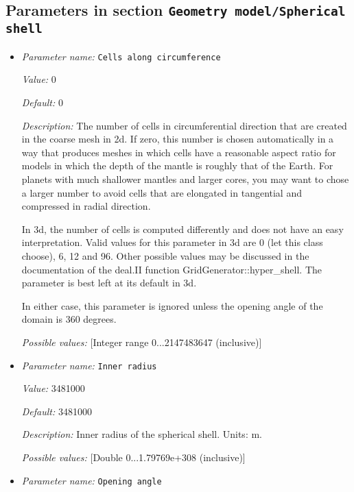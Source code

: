 \subsection{Parameters in section \tt Geometry model/Spherical shell}
\label{parameters:Geometry_20model/Spherical_20shell}

\begin{itemize}
\item {\it Parameter name:} {\tt Cells along circumference}
\label{parameters:Geometry model/Spherical shell/Cells along circumference}


{\it Value:} 0


{\it Default:} 0


{\it Description:} The number of cells in circumferential direction that are created in the coarse mesh in 2d. If zero, this number is chosen automatically in a way that produces meshes in which cells have a reasonable aspect ratio for models in which the depth of the mantle is roughly that of the Earth. For planets with much shallower mantles and larger cores, you may want to chose a larger number to avoid cells that are elongated in tangential and compressed in radial direction.

In 3d, the number of cells is computed differently and does not have an easy interpretation. Valid values for this parameter in 3d are 0 (let this class choose), 6, 12 and 96. Other possible values may be discussed in the documentation of the deal.II function GridGenerator::hyper_shell. The parameter is best left at its default in 3d.

In either case, this parameter is ignored unless the opening angle of the domain is 360 degrees.


{\it Possible values:} [Integer range 0...2147483647 (inclusive)]
\item {\it Parameter name:} {\tt Inner radius}
\label{parameters:Geometry model/Spherical shell/Inner radius}


{\it Value:} 3481000


{\it Default:} 3481000


{\it Description:} Inner radius of the spherical shell. Units: m.


{\it Possible values:} [Double 0...1.79769e+308 (inclusive)]
\item {\it Parameter name:} {\tt Opening angle}
\label{parameters:Geometry model/Spherical shell/Opening angle}



\end{itemize}
